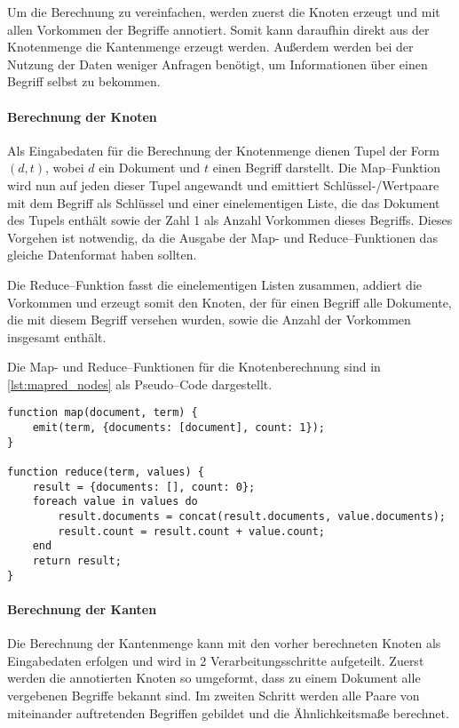 Um die Berechnung zu vereinfachen, werden zuerst die Knoten erzeugt und mit allen Vorkommen der Begriffe annotiert. Somit kann daraufhin direkt aus der Knotenmenge die Kantenmenge erzeugt werden. Außerdem werden bei der Nutzung der Daten weniger Anfragen benötigt, um Informationen über einen Begriff selbst zu bekommen.

\paragraph{Berechnung der Knoten}

Als Eingabedaten für die Berechnung der Knotenmenge dienen Tupel der Form \((d, t)\), wobei \(d\) ein Dokument und \(t\) einen Begriff darstellt. Die Map--Funktion wird nun auf jeden dieser Tupel angewandt und emittiert Schlüssel-/Wertpaare mit dem Begriff als Schlüssel und einer einelementigen Liste, die das Dokument des Tupels enthält sowie der Zahl \num{1} als Anzahl Vorkommen dieses Begriffs. Dieses Vorgehen ist notwendig, da die Ausgabe der Map- und Reduce--Funktionen das gleiche Datenformat haben sollten.

Die Reduce--Funktion fasst die einelementigen Listen zusammen, addiert die Vorkommen und erzeugt somit den Knoten, der für einen Begriff alle Dokumente, die mit diesem Begriff versehen wurden, sowie die Anzahl der Vorkommen insgesamt enthält.

Die Map- und Reduce--Funktionen für die Knotenberechnung sind in \cref{lst:mapred_nodes} als Pseudo--Code dargestellt.

\begin{lstlisting}[language=pseudo, label={lst:mapred_nodes}, caption={Knotenerzeugung mit MapReduce}]
function map(document, term) {
    emit(term, {documents: [document], count: 1});
}

function reduce(term, values) {
    result = {documents: [], count: 0};
    foreach value in values do
        result.documents = concat(result.documents, value.documents);
        result.count = result.count + value.count;
    end
    return result;
}
\end{lstlisting}

\paragraph{Berechnung der Kanten}

Die Berechnung der Kantenmenge kann mit den vorher berechneten Knoten als Eingabedaten erfolgen und wird in 2 Verarbeitungsschritte aufgeteilt. Zuerst werden die annotierten Knoten so umgeformt, dass zu einem Dokument alle vergebenen Begriffe bekannt sind. Im zweiten Schritt werden alle Paare von miteinander auftretenden Begriffen gebildet und die Ähnlichkeitsmaße berechnet.

